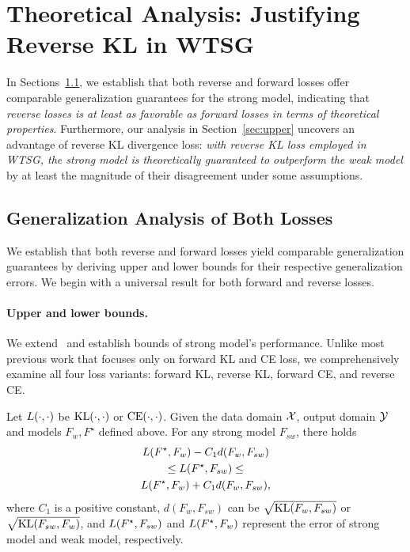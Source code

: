 \section{Theoretical Analysis: Justifying Reverse KL in WTSG}

In Sections~\ref{sec:universal}, we establish that both reverse and forward losses offer comparable generalization guarantees for the strong model, indicating that \textit{reverse losses is at least as favorable as forward losses in terms of theoretical properties}.
Furthermore, our analysis in Section~\ref{sec:upper} uncovers an advantage of reverse KL divergence loss: \textit{with reverse KL loss employed in WTSG, the strong model is theoretically guaranteed to outperform the weak model} by at least the magnitude of their disagreement under some assumptions.



\subsection{Generalization Analysis of Both Losses} \label{sec:universal}

We establish that both reverse and forward losses yield comparable generalization guarantees by deriving upper and lower bounds for their respective generalization errors.
We begin with a universal result for both forward and reverse losses.

\paragraph{Upper and lower bounds.}
We extend~\citet{yao2025understanding} and establish bounds of strong model's performance.
Unlike most previous work that focuses only on forward KL and CE loss, we comprehensively examine all four loss variants: forward KL, reverse KL, forward CE, and reverse CE.

\begin{lemma} \label{lemma:upper_lower_inf}
Let $L(\cdot, \cdot)$ be $\mathrm{KL}(\cdot, \cdot)$ or $\mathrm{CE}(\cdot, \cdot)$.
Given the data domain $\mathcal{X}$, output domain $\mathcal{Y}$ and models $F_w, F^\star$ defined above. 
For any strong model $F_{sw}$, there holds
\begin{multline*}
     L(F^\star,F_w)-C_1 d(F_w, F_{sw}) \\ \le L(F^\star, F_{sw}) \le \\ L(F^\star,F_w)+ C_1 d(F_w, F_{sw}),
\end{multline*}
where $C_1$ is a positive constant, $d(F_w, F_{sw})$ can be $\sqrt{\mathrm{KL}(F_w, F_{sw})}$ or $\sqrt{\mathrm{KL}(F_{sw}, F_w)}$, and $L(F^\star,F_{sw})$ and $L(F^\star,F_w)$ represent the error of strong model and weak model, respectively.
\end{lemma}

